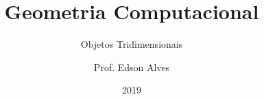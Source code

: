 \title{Geometria Computacional}
\subtitle{Objetos Tridimensionais}
\date{2019}
\author{Prof. Edson Alves}

